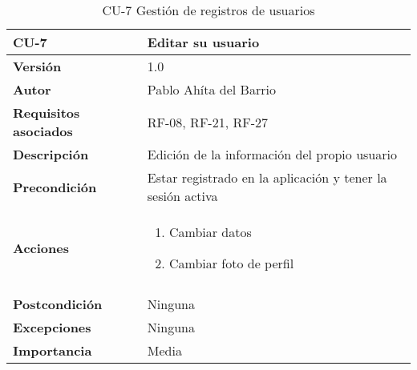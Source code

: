 \begin{table}[p]
	\centering
	\begin{tabularx}{\linewidth}{ p{} p{} }
		\toprule
		\textbf{CU-7}    & \textbf{Editar su usuario}\\
		\toprule
		\textbf{Versión}              & 1.0    \\
		\textbf{Autor}                & Pablo Ahíta del Barrio \\
		\textbf{Requisitos asociados} & RF-08, RF-21, RF-27\\
		\textbf{Descripción}          & Edición de la información del propio usuario\\
		\textbf{Precondición}         & Estar registrado en la aplicación y tener la sesión activa \\
		\textbf{Acciones}             &
		\begin{enumerate}
			\def\labelenumi{\arabic{enumi}.}
			\tightlist
			\item Cambiar datos
			\item Cambiar foto de perfil
		\end{enumerate}\\
		\\
		\textbf{Postcondición}        & Ninguna \\
		\textbf{Excepciones}          & Ninguna \\
		\textbf{Importancia}          & Media \\
		\bottomrule
	\end{tabularx}
	\caption{CU-7 Gestión de registros de usuarios}
\end{table}

